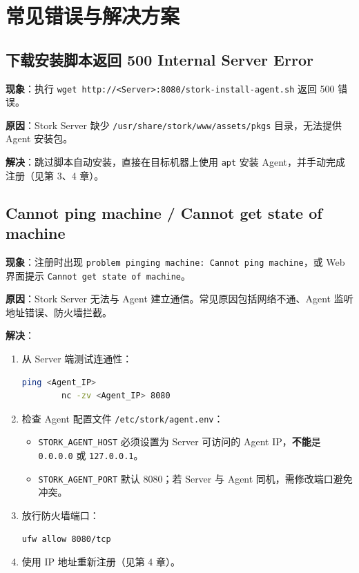 \documentclass[UTF8, a4paper, 11pt, oneside]{ctexbook}
\begin{document}
\chapter{常见错误与解决方案}

\section{下载安装脚本返回 500 Internal Server Error}

\textbf{现象}：执行 \verb|wget http://<Server>:8080/stork-install-agent.sh| 返回 500 错误。

\textbf{原因}：Stork Server 缺少 \verb|/usr/share/stork/www/assets/pkgs| 目录，无法提供 Agent 安装包。

\textbf{解决}：跳过脚本自动安装，直接在目标机器上使用 \texttt{apt} 安装 Agent，并手动完成注册（见第 3、4 章）。

\section{Cannot ping machine / Cannot get state of machine}

\textbf{现象}：注册时出现 \texttt{problem pinging machine: Cannot ping machine}，或 Web 界面提示 \texttt{Cannot get state of machine}。

\textbf{原因}：Stork Server 无法与 Agent 建立通信。常见原因包括网络不通、Agent 监听地址错误、防火墙拦截。

\textbf{解决}：

\begin{enumerate}
	\item 从 Server 端测试连通性：
	\begin{lstlisting}[language=bash]
		ping <Agent_IP>
		nc -zv <Agent_IP> 8080
	\end{lstlisting}
	\item 检查 Agent 配置文件 \verb|/etc/stork/agent.env|：
	\begin{itemize}
		\item \texttt{STORK\_AGENT\_HOST} 必须设置为 Server 可访问的 Agent IP，\textbf{不能}是 \texttt{0.0.0.0} 或 \texttt{127.0.0.1}。
		\item \texttt{STORK\_AGENT\_PORT} 默认 8080；若 Server 与 Agent 同机，需修改端口避免冲突。
	\end{itemize}
	\item 放行防火墙端口：
	\begin{lstlisting}[language=bash]
		ufw allow 8080/tcp
	\end{lstlisting}
	\item 使用 IP 地址重新注册（见第 4 章）。
\end{enumerate}
\end{document}
